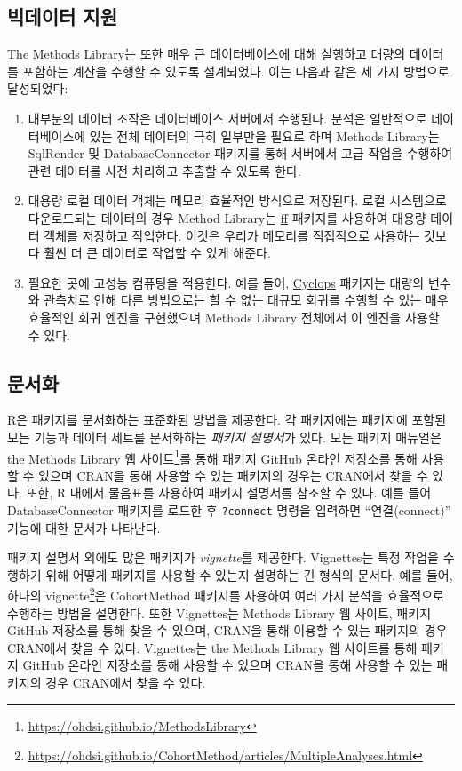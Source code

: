 \documentclass[11pt]{book}
\providecommand{\tightlist}{%
  \setlength{\itemsep}{0pt}\setlength{\parskip}{0pt}}
\let\rmarkdownfootnote\footnote%
\def\footnote{\protect\rmarkdownfootnote}
\theoremstyle{definition}
\theoremstyle{definition}
\theoremstyle{definition}
\theoremstyle{remark}
\begin{document}
\subsection{빅데이터 지원}\label{BigDataSupport}

The Methods Library는 또한 매우 큰 데이터베이스에 대해 실행하고 대량의
데이터를 포함하는 계산을 수행할 수 있도록 설계되었다. 이는 다음과 같은
세 가지 방법으로 달성되었다:

\begin{enumerate}
\def\labelenumi{\arabic{enumi}.}
\tightlist
\item
  대부분의 데이터 조작은 데이터베이스 서버에서 수행된다. 분석은
  일반적으로 데이터베이스에 있는 전체 데이터의 극히 일부만을 필요로 하며
  Methods Library는 SqlRender 및 DatabaseConnector 패키지를 통해
  서버에서 고급 작업을 수행하여 관련 데이터를 사전 처리하고 추출할 수
  있도록 한다.
\item
  대용량 로컬 데이터 객체는 메모리 효율적인 방식으로 저장된다. 로컬
  시스템으로 다운로드되는 데이터의 경우 Method Library는
  \href{https://cran.r-project.org/web/packages/ff}{ff} 패키지를
  사용하여 대용량 데이터 객체를 저장하고 작업한다. 이것은 우리가
  메모리를 직접적으로 사용하는 것보다 훨씬 더 큰 데이터로 작업할 수 있게
  해준다.
\item
  필요한 곳에 고성능 컴퓨팅을 적용한다. 예를 들어,
  \href{https://ohdsi.github.io/Cyclops/}{Cyclops} 패키지는 대량의
  변수와 관측치로 인해 다른 방법으로는 할 수 없는 대규모 회귀를 수행할
  수 있는 매우 효율적인 회귀 엔진을 구현했으며 Methods Library 전체에서
  이 엔진을 사용할 수 있다.
\end{enumerate}

\subsection{문서화}

R은 패키지를 문서화하는 표준화된 방법을 제공한다. 각 패키지에는 패키지에
포함된 모든 기능과 데이터 세트를 문서화하는 \emph{패키지 설명서}가 있다.
모든 패키지 매뉴얼은 the Methods Library 웹 사이트\footnote{\url{https://ohdsi.github.io/MethodsLibrary}}를
통해 패키지 GitHub 온라인 저장소를 통해 사용할 수 있으며 CRAN을 통해
사용할 수 있는 패키지의 경우는 CRAN에서 찾을 수 있다. 또한, R 내에서
물음표를 사용하여 패키지 설명서를 참조할 수 있다. 예를 들어
DatabaseConnector 패키지를 로드한 후 \texttt{?connect} 명령을 입력하면
``연결(connect)'' 기능에 대한 문서가 나타난다.

패키지 설명서 외에도 많은 패키지가 \emph{vignette}를 제공한다.
Vignettes는 특정 작업을 수행하기 위해 어떻게 패키지를 사용할 수 있는지
설명하는 긴 형식의 문서다. 예를 들어, 하나의 vignette\footnote{\url{https://ohdsi.github.io/CohortMethod/articles/MultipleAnalyses.html}}은
CohortMethod 패키지를 사용하여 여러 가지 분석을 효율적으로 수행하는
방법을 설명한다. 또한 Vignettes는 Methods Library 웹 사이트, 패키지
GitHub 저장소를 통해 찾을 수 있으며, CRAN을 통해 이용할 수 있는 패키지의
경우 CRAN에서 찾을 수 있다. Vignettes는 the Methods Library 웹 사이트를
통해 패키지 GitHub 온라인 저장소를 통해 사용할 수 있으며 CRAN을 통해
사용할 수 있는 패키지의 경우 CRAN에서 찾을 수 있다. 
\end{document}

